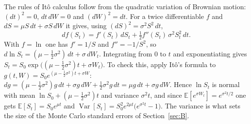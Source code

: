 The rules of It\^o calculus follow from the quadratic variation of Brownian motion: $(dt)^2=0$, $dt\,dW=0$ and $(dW)^2=dt$.
For a twice differentiable $f$ and $dS=\mu S\,dt+\sigma S\,dW$ it gives, using $(dS)^2=\sigma^2S^2\,dt$,
\begin{equation}
 df(S_t)=f'(S_t)\,dS_t+\tfrac12f''(S_t)\,\sigma^2S_t^2\,dt .
\end{equation}
With $f=\ln$ one has $f'=1/S$ and $f''=-1/S^2$, so $d\ln S_t=(\mu-\tfrac12\sigma^2)\,dt+\sigma\,dW_t$.
Integrating from $0$ to $t$ and exponentiating gives $S_t=S_0\exp\big((\mu-\tfrac12\sigma^2)t+\sigma W_t\big)$.
To check this, apply It\^o's formula to $g(t,W)=S_0e^{(\mu-\frac12\sigma^2)t+\sigma W}$: $dg=(\mu-\tfrac12\sigma^2)g\,dt+\sigma g\,dW+\tfrac12\sigma^2g\,dt=\mu g\,dt+\sigma g\,dW$.
Hence $\ln S_t$ is normal with mean $\ln S_0+(\mu-\tfrac12\sigma^2)t$ and variance $\sigma^2t$, and since $\mathbb E[e^{\sigma W_t}]=e^{\sigma^2t/2}$ one gets $\mathbb E[S_t]=S_0e^{\mu t}$ and $\operatorname{Var}[S_t]=S_0^2e^{2\mu t}\big(e^{\sigma^2t}-1\big)$.
The variance is what sets the size of the Monte Carlo standard errors of Section~\ref{sec:B}.

